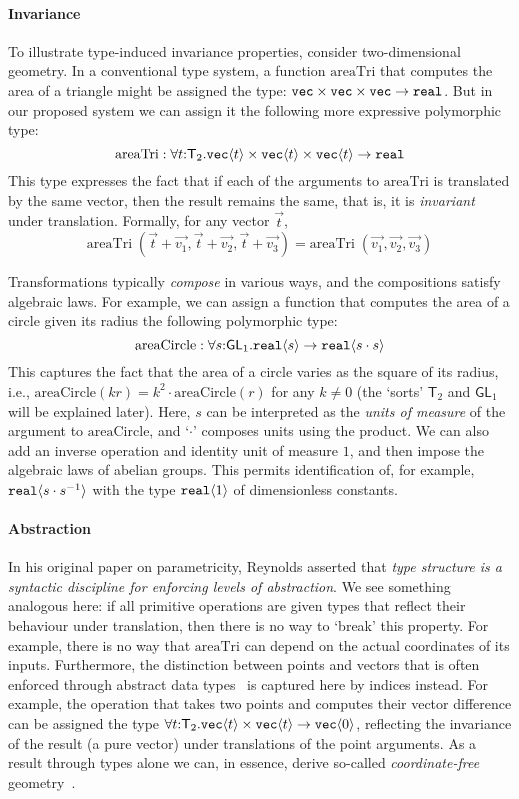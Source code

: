 \documentclass{sigplanconf}
\newcommand{\SynGL}[1]{\mathsf{GL}_#1}
\newcommand{\SynTransl}[1]{\mathsf{T}_#1}
\newcommand{\tyReal}{\texttt{real}}
\newcommand{\tyPrim}[2]{\textup{\texttt{#1}}\langle #2 \rangle}
\newcommand{\tyPrimNm}[1]{\textup{\texttt{#1}}}
\newcommand{\tyArr}{\to}
\theoremstyle{examplestyle}
\theoremstyle{restatementstyle}
\begin{document}
\paragraph{Invariance}
To illustrate type-induced invariance properties, consider
two-dimensional geometry. 
In a conventional type system, a function $\mathrm{areaTri}$ that computes the area of a triangle
might be assigned the type:
$\tyPrimNm{vec}\times\tyPrimNm{vec}\times\tyPrimNm{vec}\tyArr\tyReal$.
But in our proposed system we can assign it the following more expressive polymorphic
type:
\[
\mathrm{areaTri} : \forall t\mathord:\SynTransl{2}.
  \tyPrim{vec}{t} \times \tyPrim{vec}{t} \times \tyPrim{vec}{t} \to \tyReal \\
\]
This type expresses the fact that if each of the arguments to $\mathrm{areaTri}$
is translated by the same vector, then the result remains the same,
that is, it is \emph{invariant} under translation. Formally, for any 
vector $\vec t$,
\[
\mathrm{areaTri}\;(\vec{t} + \vec{v_1}, \vec{t} + \vec{v_2}, \vec{t} + \vec{v_3}) = 
\mathrm{areaTri}\;(\vec{v_1}, \vec{v_2}, \vec{v_3})
\]

Transformations typically \emph{compose} in various
ways, and the compositions satisfy algebraic laws. For example, 
we can assign a function that computes the area of a circle given its
radius the following polymorphic type:
\[
\mathrm{areaCircle} : \forall s\mathord:\SynGL{1}.\tyPrim{real}{s}\to
\tyPrim{real}{s\cdot s}
\]
This captures the fact that the area of a circle varies as the square
of its radius, i.e., $\mathrm{areaCircle}(k r) = k^2\cdot
\mathrm{areaCircle}(r)$ for any $k\neq 0$ (the `sorts' $\SynTransl{2}$ and
$\SynGL{1}$ will be explained later).  Here, $s$ 
can be interpreted as the \emph{units of measure} of the argument to
$\mathrm{areaCircle}$, and `$\cdot$' composes units using the
product. We can also add an inverse operation and identity unit of
measure $1$, and then impose the algebraic laws of abelian
groups. This permits identification of, for example,
$\tyPrim{real}{s\cdot s^{-1}}$ with the type
$\tyPrim{real}{1}$ of dimensionless constants.

\paragraph{Abstraction}
In his original paper on parametricity, Reynolds asserted that
\emph{type structure is a syntactic discipline for enforcing levels of
  abstraction}.  We see something analogous here: if all primitive
operations are given types that reflect their behaviour under
translation, then there is no way to `break' this property. For
example, there is no way that $\mathrm{areaTri}$ can depend on the
actual coordinates of its inputs. Furthermore, the distinction between
points and vectors that is often enforced through abstract data
types~\cite{CGAL} is captured here by indices instead. For example,
the operation that takes two points and computes their vector
difference can be assigned the type
$\forall t\mathord:\SynTransl{2}.\tyPrim{vec}t\times\tyPrim{vec}t\to\tyPrim{vec}0$,
reflecting the invariance of the result (a pure vector) under
translations of the point arguments. As a result through types alone
we can, in essence, derive so-called \emph{coordinate-free}
geometry~\cite{CFGADT}.
\end{document}
